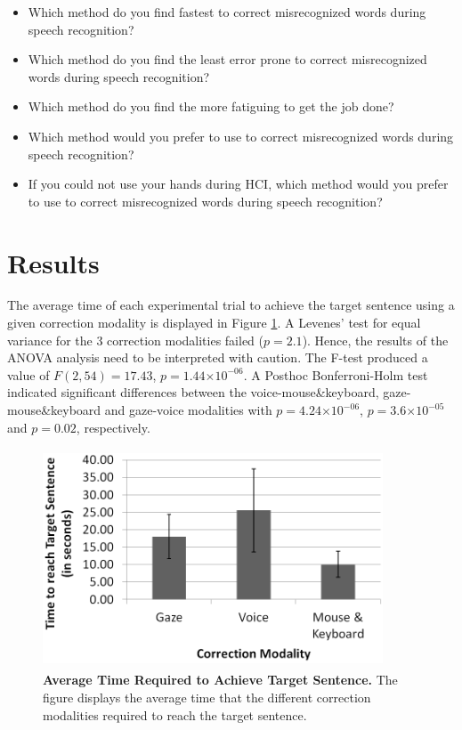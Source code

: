 \documentclass[]{article}
\providecommand{\e}[1]{\ensuremath{\times 10^{#1}}}
\begin{document}
\begin{itemize}
  \item Which method do you find fastest to correct misrecognized words during speech recognition?
	\item Which method do you find the least error prone to correct misrecognized words during speech recognition?
	\item Which method do you find the more fatiguing to get the job done?
	\item Which method would you prefer to use to correct misrecognized words during speech recognition?
	\item If you could not use your hands during HCI, which method would you prefer to use to correct misrecognized words during speech recognition?
\end{itemize}


\section{Results}
The average time of each experimental trial to achieve the target sentence using a given correction modality is
displayed in Figure \ref{timeFig}. A Levenes' test for equal variance for the 3 correction modalities failed ($p=2.1$).
Hence, the results of the ANOVA analysis need to be interpreted with caution. The F-test produced a value of
$F(2,54)=17.43$, $p=1.44\e{-06}$. A Posthoc Bonferroni-Holm test indicated significant differences between the
voice-mouse\&keyboard, gaze-mouse\&keyboard and gaze-voice modalities with $p=4.24\e{-06}$, $p=3.6\e{-05}$ and $p=0.02$,
respectively.
 

\begin{figure}[!ht]
\begin{center}
\includegraphics[width=0.9\textwidth,height=65mm]{figures/time.png}
\end{center}
\vspace{-3mm}
\caption{\textbf{Average Time Required to Achieve Target Sentence.} The figure displays the average time that the different
correction modalities required to reach the target sentence.}
\label{timeFig}
\end{figure}
\end{document}
